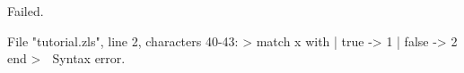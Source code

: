 \runverbatimfalse
{}
\begin{RunVerbatimMsg}
Failed.
\end{RunVerbatimMsg}
\begin{RunVerbatimErr}
File "tutorial.zls", line 2, characters 40-43:
>  match x with | true -> 1 | false -> 2 end
>                                        ^^^
Syntax error.
\end{RunVerbatimErr}
